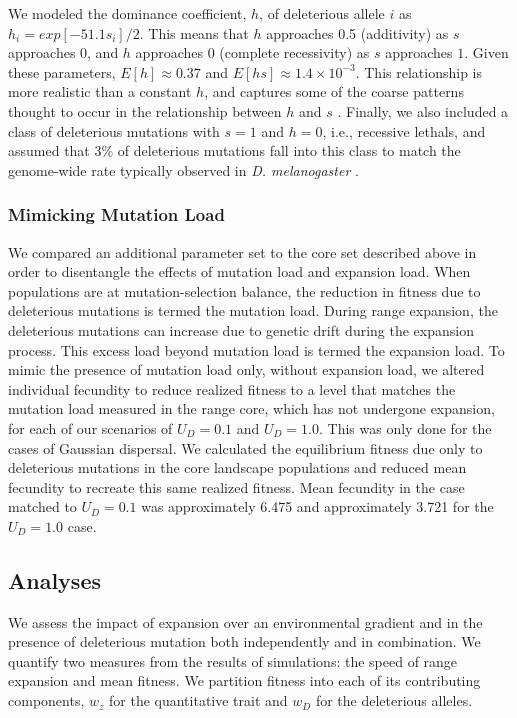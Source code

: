 We modeled the dominance coefficient, $h$, of deleterious allele $i$ as $h_i = exp[-51.1 s_i]/2$. This means that $h$ approaches 0.5 (additivity) as $s$ approaches $0$, and $h$ approaches $0$ (complete recessivity) as $s$ approaches $1$. Given these parameters, %
$E[h] \approx 0.37$ and $E[hs] \approx 1.4\times10^{-3}$. This relationship is more realistic than a constant $h$, and captures some of the coarse patterns thought to occur in the relationship between $h$ and $s$ \citep{Agrawal:2011}. Finally, we also included a class of deleterious mutations with $s = 1$ and $h = 0$, i.e., recessive lethals, and assumed that 3\% of deleterious mutations fall into this class to match the genome-wide rate typically observed in \emph{D. melanogaster} \citep{Fry:1999}.


\subsubsection*{Mimicking Mutation Load} %
We compared an additional parameter set to the core set described above in order to disentangle the effects of mutation load and expansion load. When populations are at mutation-selection balance, the reduction in fitness due to deleterious mutations is termed the mutation load. During range expansion, the deleterious mutations can increase due to genetic drift during the expansion process. This excess load beyond mutation load is termed the expansion load. To mimic the presence of mutation load only, without expansion load, we altered individual fecundity to reduce realized fitness to a level that matches the mutation load measured in the range core, which has not undergone expansion, for each of our scenarios of $U_D = 0.1$ and $U_D = 1.0$. This was only done for the cases of Gaussian dispersal. We calculated the equilibrium fitness due only to deleterious mutations in the core landscape populations and reduced mean fecundity to recreate this same realized fitness. Mean fecundity in the case matched to $U_D = 0.1$ was approximately 6.475 %
and approximately 3.721 %
for the $U_D = 1.0$ case.



\subsection*{Analyses}
We assess the impact of expansion over an environmental gradient and in the presence of deleterious mutation both independently and in combination. We quantify two measures from the results of simulations: the speed of range expansion and mean fitness. We partition fitness into each of its contributing components, $w_z$ for the quantitative trait and $w_D$ for the deleterious alleles. 

